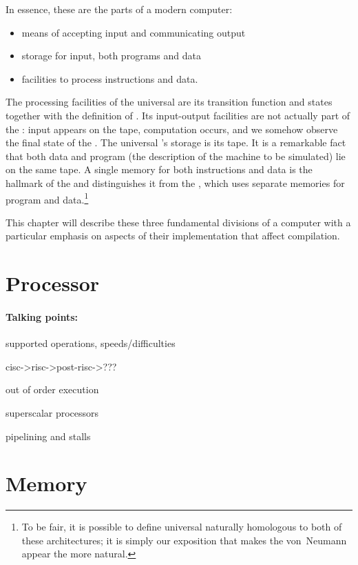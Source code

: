 In essence, these are the parts of a modern computer:
\begin{itemize}
\item means of accepting input and communicating output
\item storage for input, both programs and data
\item facilities to process instructions and data.
\end{itemize}
The processing facilities of the universal \TM are its transition function and states together with the definition of \TMs. Its input-output facilities are not actually part of the \TM: input appears on the tape, computation occurs, and we somehow observe the final state of the \TM. The universal \TM's storage is its tape. It is a remarkable fact that both data and program (the description of the machine to be simulated) lie on the same tape. A single memory for both instructions and data is the hallmark of the  and distinguishes it from the , which uses separate memories for program and data.\footnote{To be fair, it is possible to define universal \TMs naturally homologous to both of these architectures; it is simply our exposition that makes the von~Neumann appear the more natural.}

This chapter will describe these three fundamental divisions of a computer with a particular emphasis on aspects of their implementation that affect compilation.

\section{Processor}
\paragraph{Talking points:}
\begin{aenumerate}
\item supported operations, speeds/difficulties
\item cisc->risc->post-risc->???
\item out of order execution
\item superscalar processors
\item pipelining and stalls
\end{aenumerate}

\section{Memory}
